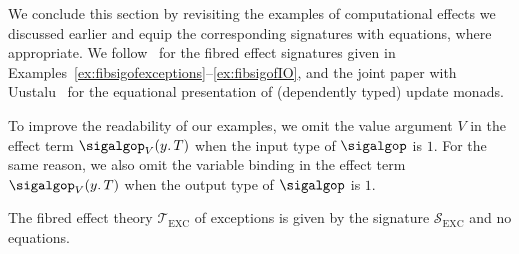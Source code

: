 We conclude this section by revisiting the examples of computational effects we discussed earlier and equip the corresponding signatures with equations, where appropriate. We follow~\cite{Plotkin:HandlingEffects} for the fibred effect signatures given in Examples~\ref{ex:fibsigofexceptions}--\ref{ex:fibsigofIO}, and the joint paper with Uustalu~\cite{Ahman:UpdateMonads} for the equational presentation of (dependently typed) update monads. 

To improve the readability of our examples, we omit the value argument $V$ in the effect term $\sigalgop_V(y .\, T)$ when the input type of $\sigalgop$ is $1$. For the same reason, we also omit the variable binding in the effect term $\sigalgop_V(y .\, T)$ when the output type of $\sigalgop$ is $1$.

\begin{example}[Exceptions]
\label{ex:fibtheoryofexceptions}
The fibred effect theory $\mathcal{T}_{\text{EXC}}$ of exceptions is given by the signature $\mathcal{S}_{\text{EXC}}$ and no equations.
\end{example}

